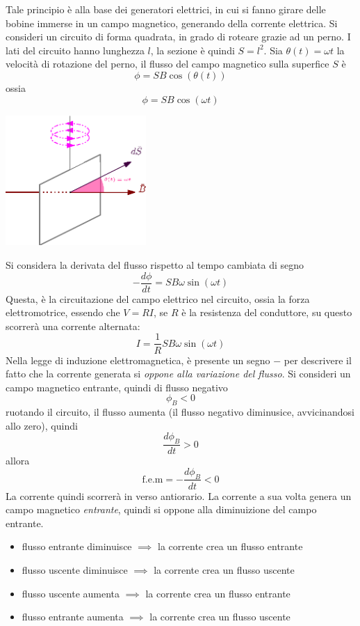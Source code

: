 \documentclass[10pt, letterpaper]{report}
\begin{document}
Tale principio è alla base dei generatori elettrici, in cui si fanno girare delle bobine immerse in un campo magnetico, generando della corrente elettrica. \acc Si consideri un circuito di forma quadrata, in grado di roteare grazie ad un perno. I lati del circuito hanno lunghezza $l$, la sezione è quindi $S=l^2$. Sia $\theta(t)=\omega t$ la velocità di rotazione del perno, il flusso del campo magnetico sulla superfice $S$ è 
$$ \phi=SB\cos(\theta(t))$$
ossia 
$$ \phi = SB\cos(\omega t)$$\begin{center}
    \includegraphics[width=0.4\textwidth ]{images/Faraday3.eps}
\end{center}
Si considera la derivata del flusso rispetto al tempo cambiata di segno
$$ -\dfrac{d\phi}{dt}=SB\omega\sin(\omega t)$$
Questa, è la circuitazione del campo elettrico nel circuito, ossia la forza elettromotrice, essendo che $V=RI$, se $R$ è la resistenza del conduttore, su questo scorrerà una corrente alternata:
$$ I=\frac{1}{R}SB\omega\sin(\omega t)$$
Nella legge di induzione elettromagnetica, è presente un segno $-$ per descrivere il fatto che la corrente generata si \textit{oppone alla variazione del flusso}. Si consideri un campo magnetico entrante, quindi di flusso negativo $$\phi_B<0$$
ruotando il circuito, il flusso aumenta (il flusso negativo diminusice, avvicinandosi allo zero), quindi 
$$ \frac{d\phi_B}{dt}>0$$
allora 
$$ \text{f.e.m}=-\frac{d\phi_B}{dt} <0$$
La corrente quindi scorrerà in verso antiorario. La corrente a sua volta genera un campo magnetico \textit{entrante}, quindi si oppone alla diminuizione del campo entrante. 
\begin{itemize}
    \item flusso entrante diminuisce $\implies$ la corrente crea un flusso entrante  
    \item flusso uscente diminuisce $\implies$ la corrente crea un flusso uscente 
    \item flusso uscente aumenta $\implies$ la corrente crea un flusso entrante  
    \item flusso entrante aumenta $\implies$ la corrente crea un flusso uscente 
\end{itemize}
\end{document}
